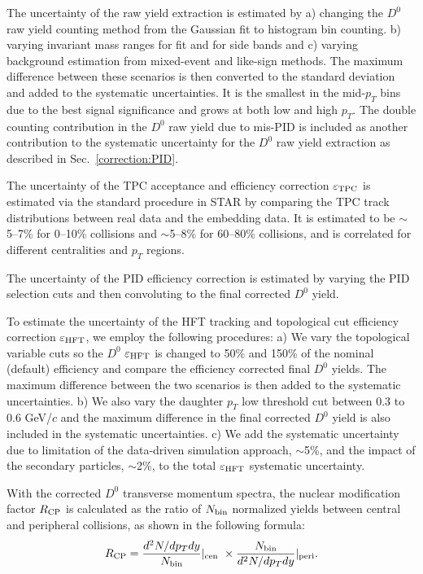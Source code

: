 \documentclass[%
 reprint,	
 amsmath,amssymb,
 aps,
 prc,
]{revtex4-1}
\begin{document}
The uncertainty of the raw yield extraction is estimated by a) changing the $D^0$ raw yield counting method from the Gaussian fit to histogram bin counting. b) varying invariant mass ranges for fit and for side bands and c) varying background estimation from mixed-event and like-sign methods. The maximum difference between these scenarios is then converted to the standard deviation and added to the systematic uncertainties. It is the smallest in the mid-$p_{T}$ bins due to the best signal significance and grows at both low and high $p_{T}$. The double counting contribution in the $D^0$ raw yield  due to mis-PID is included as another contribution to the systematic uncertainty for the $D^0$ raw yield extraction as described in Sec.~\ref{correction:PID}.

The uncertainty of the TPC acceptance and efficiency correction $\varepsilon_{\rm TPC}$ is estimated via the standard procedure in STAR by comparing the TPC track distributions between real data and the embedding data. It is estimated to be $\sim$5--7\% for 0--10\% collisions and $\sim$5--8\% for 60--80\% collisions, and is correlated for different centralities and $p_{T}$ regions. 

The uncertainty of the PID efficiency correction is estimated by varying the PID selection cuts and then convoluting to the final corrected $D^0$ yield. 


To estimate the uncertainty of the HFT tracking and topological cut efficiency correction $\varepsilon_{\rm HFT}$, we employ the following procedures: a) We vary the topological variable cuts so the $D^0$ $\varepsilon_{\rm HFT}$ is changed to 50\% and 150\% of the nominal (default) efficiency and compare the efficiency corrected final $D^0$ yields. The maximum difference between the two scenarios is then added to the systematic uncertainties. b) We also vary the daughter $p_{T}$ low threshold cut between 0.3 to 0.6 GeV/$c$ and the maximum difference in the final corrected $D^0$ yield is also included in the systematic uncertainties. c) We add the systematic uncertainty due to limitation of the data-driven simulation approach, $\sim$5\%, and the impact of the secondary particles, $\sim$2\%, to the total $\varepsilon_{\rm HFT}$ systematic uncertainty.

With the corrected $D^0$ transverse momentum spectra, the nuclear modification factor $R_{\rm CP}$ is calculated as the ratio of $N_{\rm bin}$ normalized yields between central and peripheral collisions, as shown in the following formula:
\begin{equation}
  R_{\rm CP} = \frac{d^2N/dp_{T}dy}{N_{\rm bin}} |_{\rm cen\ } \times \frac{N_{\rm bin}} {d^2N/dp_{T}dy} |_{\rm peri }.
\label{equ:equation3}
\end{equation}
\end{document}
